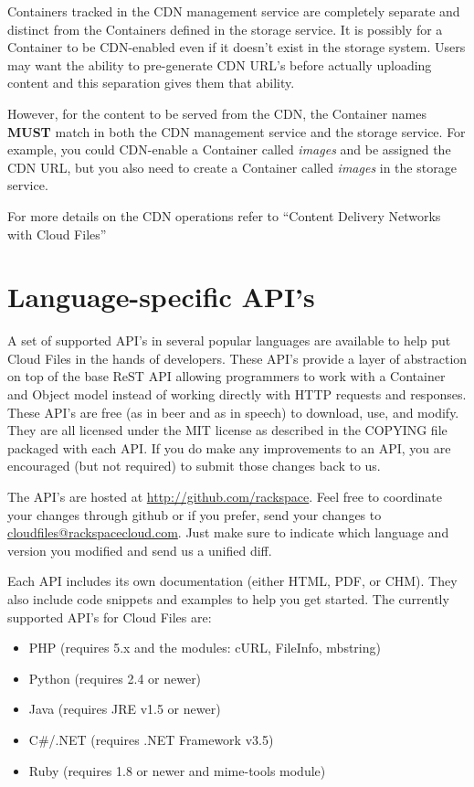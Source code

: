 \documentclass[letterpaper,10pt,english]{manual}
\begin{document}
Containers tracked in the CDN management service are completely separate
and distinct from the Containers defined in the storage service.  It
is possibly for a Container to be CDN-enabled even if it doesn't exist
in the storage system.  Users may want the ability to pre-generate
CDN URL's before actually uploading content and this separation gives
them that ability.

However, for the content to be served from the CDN, the Container names
\textbf{MUST} match in both the CDN management service and the storage service.
For example, you could CDN-enable a Container called \emph{images} and be
assigned the CDN URL, but you also need to create a Container called
\emph{images} in the storage service.

For more details on the CDN operations refer to “Content Delivery Networks
with Cloud Files”


\chapter{Language-specific API's}

A set of supported API's in several popular languages are available to
help put Cloud Files in the hands of developers.  These API's provide a
layer of abstraction on top of the base ReST API allowing programmers to
work with a Container and Object model instead of working directly with
HTTP requests and responses.   These API's are free (as in beer and as in
speech) to download, use, and modify.  They are all licensed under the
MIT license as described in the COPYING file packaged with each API.  If
you do make any improvements to an API, you are encouraged (but not
required) to submit those changes back to us.

The API's are hosted at \href{http://github.com/rackspace}{http://github.com/rackspace}.  Feel free to
coordinate your changes through github or if you prefer, send
your changes to \href{mailto:cloudfiles@rackspacecloud.com}{cloudfiles@rackspacecloud.com}.  Just make sure to
indicate which language and version you modified and send us a unified
diff.

Each API includes its own documentation (either HTML, PDF, or CHM).
They also include code snippets and examples to help you get started.
The currently supported API's for Cloud Files are:
\begin{itemize}
\item {} 
PHP (requires 5.x and the modules: cURL, FileInfo, mbstring)

\item {} 
Python (requires 2.4 or newer)

\item {} 
Java (requires JRE v1.5 or newer)

\item {} 
C\#/.NET (requires .NET Framework v3.5)

\item {} 
Ruby (requires 1.8 or newer and mime-tools module)

\end{itemize}
\end{document}
